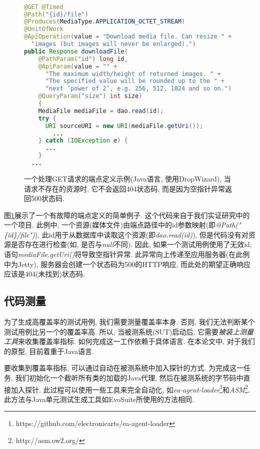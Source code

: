     \begin{figure}
        {
        \tt
        \small
      \begin{lstlisting}[language=java]
@GET @Timed
@Path("{id}/file") 
@Produces(MediaType.APPLICATION_OCTET_STREAM)
@UnitOfWork
@ApiOperation(value = "Download media file. Can resize " +
  "images (but images will never be enlarged).") 
public Response downloadFile(
    @PathParam("id") long id, 
    @ApiParam(value = "" +
      "The maximum width/height of returned images. " + 
      "The specified value will be rounded up to the " + 
      "next ’power of 2’, e.g. 256, 512, 1024 and so on.")
    @QueryParam("size") int size)
    {
    MediaFile mediaFile = dao.read(id); 
    try {
      URI sourceURI = new URI(mediaFile.getUri());
        ...
    } catch (IOException e) {
      ... 
    }
  ...
        \end{lstlisting}
        }
        \caption[]{一个处理GET请求的端点定义示例(Java语言, 使用DropWizard), 当请求不存在的资源时, 它不会返回404状态码, 而是因为空指针异常返回500状态码. }
        \label{fig3}
    \end{figure}
        
    图\ref{fig3}展示了一个有故障的端点定义的简单例子. 这个代码来自于我们实证研究中的一个项目. 此例中, 一个资源(媒体文件)由端点路径中的id参数映射(即\textit{@Path("\{id\}/file")}). 此id用于从数据库中读取这个资源(即\textit{dao.read(id)}), 但是代码没有对资源是否存在进行检查(如, 是否与\textit{null}不同). 因此, 如果一个测试用例使用了无效id, 语句\textit{mediaFile.getUri()}将导致空指针异常. 此异常向上传递至应用服务器(在此例中为Jetty), 服务器会创建一个状态码为500的HTTP响应, 而此处的期望正确响应应该是404(未找到)状态码. 

    \subsection{代码测量}
    为了生成高覆盖率的测试用例, 我们需要测量覆盖率本身. 否则, 我们无法判断某个测试用例比另一个的覆盖率高. 所以, 当被测系统(SUT)启动后, 它需要\textit{被装上测量工具}来收集覆盖率指标. 如何完成这一工作依赖于具体语言. 在本论文中, 对于我们的原型, 目前着重于Java语言. 
    
    要收集到覆盖率指标, 可以通过自动在被测系统中加入探针的方式. 为完成这一任务, 我们初始化一个截听所有类的加载的Java代理, 然后在被测系统的字节码中直接加入探针. 此过程可以使用一些工具来完全自动化, 如\textit{ea-agent-loader}\footnote{https://github.com/electronicarts/ea-agent-loader}和\textit{ASM}\footnote{http://asm.ow2.org/}. 此方法与Java单元测试生成工具如EvoSuite所使用的方法相同. 
    
